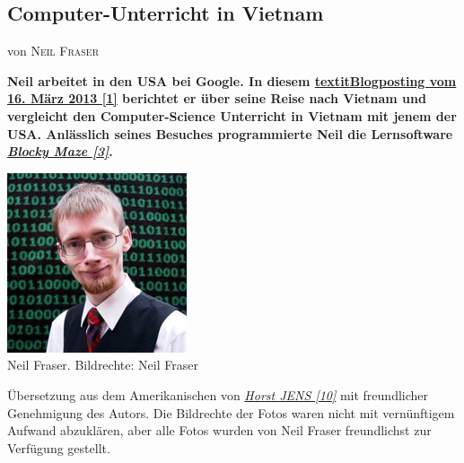 \documentclass[10pt,a4paper,ngerman,twoside]{article} %
\newcommand{\NewsItem}[1]{ %
\usefont{T1}{fvs}{n}{n} %
\vspace{24pt}\large #1\vspace{3pt} %
\par \normalsize \normalfont}
\newcommand{\NewsAuthor}[1]{ %
\hfill von \textsc{#1} \vspace{20pt} %
\par \normalfont}
\begin{document}
\begin{multicols}{3}
\NewsItem{}
\section*{Computer-Unterricht in Vietnam}
\label{vietnam}
\NewsAuthor{Neil Fraser}

\textbf{Neil arbeitet in den USA bei Google. In diesem \href{http://neil.fraser.name/news/2013/03/16/}{textit{Blogposting vom 16. M\"arz 2013 [1]}} berichtet er über seine Reise nach Vietnam und vergleicht den Computer-Science Unterricht in Vietnam mit jenem der USA. Anlässlich seines Besuches programmierte Neil die Lernsoftware \href{http://blockly-demo.appspot.com/static/apps/maze/en.html?level=1}{\textit{Blocky Maze [3]}}.} 

\begin{center}
\includegraphics[width=\linewidth]{vietnam/vietnam_neil_fraser.jpg} \\
\footnotesize{Neil Fraser. Bildrechte: Neil Fraser}
\end{center}

Übersetzung aus dem Amerikanischen von \href{http://spielend-programmieren.at}{\textit{Horst JENS [10]}}  mit freundlicher Genehmigung des Autors. Die Bildrechte der Fotos waren nicht mit vernünftigem Aufwand abzuklären, aber alle Fotos wurden von Neil Fraser freundlichst zur Verfügung gestellt. \\


\end{multicols}
\end{document}
